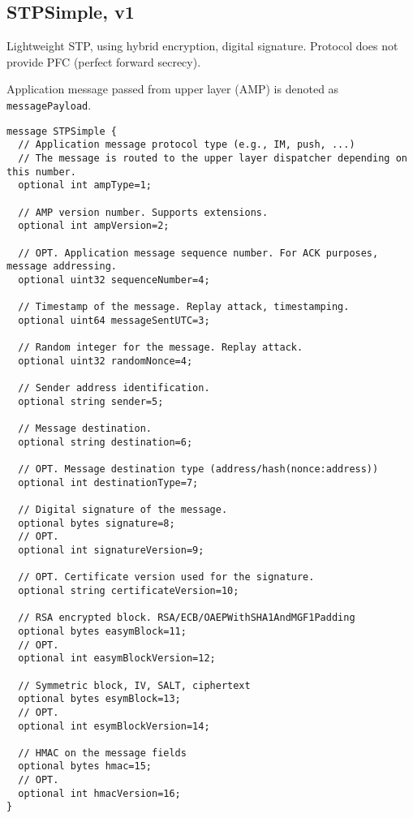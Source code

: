 \documentclass[a4paper,10pt]{article}
\begin{document}
\subsection{STPSimple, v1}
Lightweight STP, using hybrid encryption, digital signature. Protocol does not provide PFC (perfect forward secrecy).

Application message passed from upper layer (AMP) is denoted as \verb#messagePayload#. 
\begin{Verbatim}[frame=single]
message STPSimple {
  // Application message protocol type (e.g., IM, push, ...)
  // The message is routed to the upper layer dispatcher depending on this number.
  optional int ampType=1;
  
  // AMP version number. Supports extensions.
  optional int ampVersion=2;
  
  // OPT. Application message sequence number. For ACK purposes, message addressing.
  optional uint32 sequenceNumber=4;
  
  // Timestamp of the message. Replay attack, timestamping.
  optional uint64 messageSentUTC=3;
  
  // Random integer for the message. Replay attack.
  optional uint32 randomNonce=4;
  
  // Sender address identification.
  optional string sender=5;
  
  // Message destination.
  optional string destination=6;
  
  // OPT. Message destination type (address/hash(nonce:address))
  optional int destinationType=7;
  
  // Digital signature of the message.
  optional bytes signature=8;
  // OPT.
  optional int signatureVersion=9;
  
  // OPT. Certificate version used for the signature.
  optional string certificateVersion=10;
  
  // RSA encrypted block. RSA/ECB/OAEPWithSHA1AndMGF1Padding
  optional bytes easymBlock=11;
  // OPT.
  optional int easymBlockVersion=12;
  
  // Symmetric block, IV, SALT, ciphertext
  optional bytes esymBlock=13;
  // OPT.
  optional int esymBlockVersion=14;
  
  // HMAC on the message fields
  optional bytes hmac=15;
  // OPT.
  optional int hmacVersion=16;
}
\end{Verbatim} 
\end{document}
